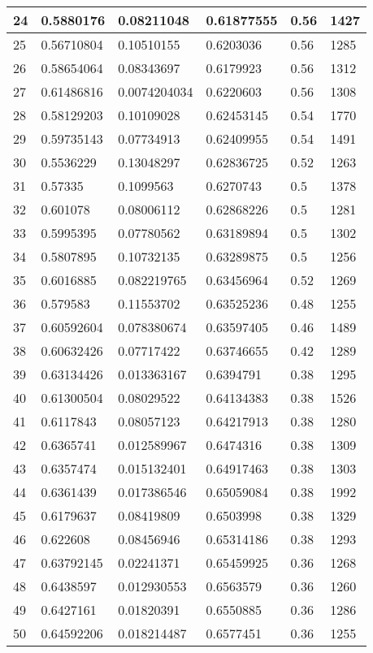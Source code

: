 \begin{longtable}{|l|l|l|l|l|l|}
24 & 0.5880176 & 0.08211048 & 0.61877555 & 0.56 & 1427 \\ \hline 
25 & 0.56710804 & 0.10510155 & 0.6203036 & 0.56 & 1285 \\ \hline 
26 & 0.58654064 & 0.08343697 & 0.6179923 & 0.56 & 1312 \\ \hline 
27 & 0.61486816 & 0.0074204034 & 0.6220603 & 0.56 & 1308 \\ \hline 
28 & 0.58129203 & 0.10109028 & 0.62453145 & 0.54 & 1770 \\ \hline 
29 & 0.59735143 & 0.07734913 & 0.62409955 & 0.54 & 1491 \\ \hline 
30 & 0.5536229 & 0.13048297 & 0.62836725 & 0.52 & 1263 \\ \hline 
31 & 0.57335 & 0.1099563 & 0.6270743 & 0.5 & 1378 \\ \hline 
32 & 0.601078 & 0.08006112 & 0.62868226 & 0.5 & 1281 \\ \hline 
33 & 0.5995395 & 0.07780562 & 0.63189894 & 0.5 & 1302 \\ \hline 
34 & 0.5807895 & 0.10732135 & 0.63289875 & 0.5 & 1256 \\ \hline 
35 & 0.6016885 & 0.082219765 & 0.63456964 & 0.52 & 1269 \\ \hline 
36 & 0.579583 & 0.11553702 & 0.63525236 & 0.48 & 1255 \\ \hline 
37 & 0.60592604 & 0.078380674 & 0.63597405 & 0.46 & 1489 \\ \hline 
38 & 0.60632426 & 0.07717422 & 0.63746655 & 0.42 & 1289 \\ \hline 
39 & 0.63134426 & 0.013363167 & 0.6394791 & 0.38 & 1295 \\ \hline 
40 & 0.61300504 & 0.08029522 & 0.64134383 & 0.38 & 1526 \\ \hline 
41 & 0.6117843 & 0.08057123 & 0.64217913 & 0.38 & 1280 \\ \hline 
42 & 0.6365741 & 0.012589967 & 0.6474316 & 0.38 & 1309 \\ \hline 
43 & 0.6357474 & 0.015132401 & 0.64917463 & 0.38 & 1303 \\ \hline 
44 & 0.6361439 & 0.017386546 & 0.65059084 & 0.38 & 1992 \\ \hline 
45 & 0.6179637 & 0.08419809 & 0.6503998 & 0.38 & 1329 \\ \hline 
46 & 0.622608 & 0.08456946 & 0.65314186 & 0.38 & 1293 \\ \hline 
47 & 0.63792145 & 0.02241371 & 0.65459925 & 0.36 & 1268 \\ \hline 
48 & 0.6438597 & 0.012930553 & 0.6563579 & 0.36 & 1260 \\ \hline 
49 & 0.6427161 & 0.01820391 & 0.6550885 & 0.36 & 1286 \\ \hline 
50 & 0.64592206 & 0.018214487 & 0.6577451 & 0.36 & 1255 \\ \hline 
\end{longtable}